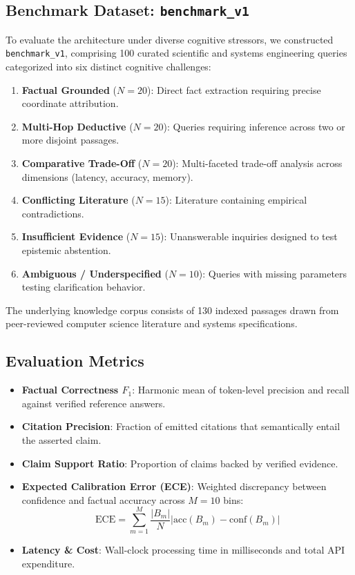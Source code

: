 \documentclass[journal,compsoc]{IEEEtran}
\begin{document}
\subsection{Benchmark Dataset: \texttt{benchmark\_v1}}
To evaluate the architecture under diverse cognitive stressors, we constructed \texttt{benchmark\_v1}, comprising 100 curated scientific and systems engineering queries categorized into six distinct cognitive challenges:
\begin{enumerate}
    \item \textbf{Factual Grounded} ($N=20$): Direct fact extraction requiring precise coordinate attribution.
    \item \textbf{Multi-Hop Deductive} ($N=20$): Queries requiring inference across two or more disjoint passages.
    \item \textbf{Comparative Trade-Off} ($N=20$): Multi-faceted trade-off analysis across dimensions (latency, accuracy, memory).
    \item \textbf{Conflicting Literature} ($N=15$): Literature containing empirical contradictions.
    \item \textbf{Insufficient Evidence} ($N=15$): Unanswerable inquiries designed to test epistemic abstention.
    \item \textbf{Ambiguous / Underspecified} ($N=10$): Queries with missing parameters testing clarification behavior.
\end{enumerate}
The underlying knowledge corpus consists of 130 indexed passages drawn from peer-reviewed computer science literature and systems specifications.

\subsection{Evaluation Metrics}
\begin{itemize}
    \item \textbf{Factual Correctness $F_1$}: Harmonic mean of token-level precision and recall against verified reference answers.
    \item \textbf{Citation Precision}: Fraction of emitted citations that semantically entail the asserted claim.
    \item \textbf{Claim Support Ratio}: Proportion of claims backed by verified evidence.
    \item \textbf{Expected Calibration Error (ECE)}: Weighted discrepancy between confidence and factual accuracy across $M=10$ bins:
    \begin{equation}
    \text{ECE} = \sum_{m=1}^M \frac{|B_m|}{N} |\text{acc}(B_m) - \text{conf}(B_m)|
    \end{equation}
    \item \textbf{Latency \& Cost}: Wall-clock processing time in milliseconds and total API expenditure.
\end{itemize}
\end{document}
